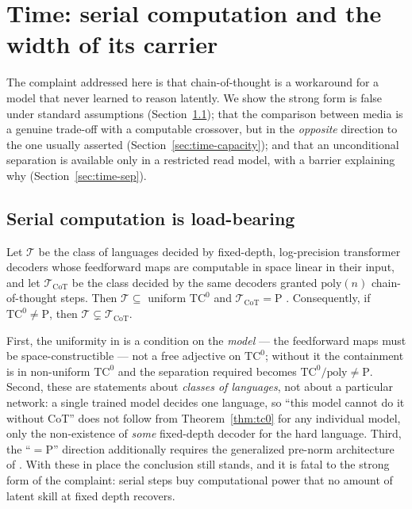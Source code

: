 \section{Time: serial computation and the width of its carrier}
\label{sec:time}

The complaint addressed here is that chain-of-thought is a workaround for a
model that never learned to reason latently. We show the strong form is false
under standard assumptions (Section~\ref{sec:time-necessary}); that the
comparison between media is a genuine trade-off with a computable crossover, but
in the \emph{opposite} direction to the one usually asserted
(Section~\ref{sec:time-capacity}); and that an unconditional separation is
available only in a restricted read model, with a barrier explaining why
(Section~\ref{sec:time-sep}).

\subsection{Serial computation is load-bearing}
\label{sec:time-necessary}

\begin{theorem}
\label{thm:tc0}
Let $\mathcal{T}$ be the class of languages decided by fixed-depth,
log-precision transformer decoders whose feedforward maps are computable in
space linear in their input, and let $\mathcal{T}_{\mathrm{CoT}}$ be the class
decided by the same decoders granted $\mathrm{poly}(n)$ chain-of-thought steps.
Then $\mathcal{T} \subseteq$ uniform $\mathrm{TC}^0$ \cite{merrill2023} and
$\mathcal{T}_{\mathrm{CoT}} = \mathrm{P}$ \cite{merrill2024}. Consequently, if
$\mathrm{TC}^0 \ne \mathrm{P}$, then
$\mathcal{T} \subsetneq \mathcal{T}_{\mathrm{CoT}}$.
\end{theorem}

\begin{remark}
\label{rem:tc0-care}
First, the uniformity in \cite{merrill2023} is a condition on the \emph{model}
--- the feedforward maps must be space-constructible --- not a free adjective on
$\mathrm{TC}^0$; without it the containment is in non-uniform $\mathrm{TC}^0$ and
the separation required becomes $\mathrm{TC}^0/\mathrm{poly} \ne \mathrm{P}$.
Second, these are statements about \emph{classes of languages}, not about a
particular network: a single trained model decides one language, so
``this model cannot do it without CoT'' does not follow from
Theorem~\ref{thm:tc0} for any individual model, only the non-existence of
\emph{some} fixed-depth decoder for the hard language. Third, the ``$=\mathrm{P}$''
direction additionally requires the generalized pre-norm architecture of
\cite{merrill2024}. With these in place the conclusion still stands, and it is
fatal to the strong form of the complaint: serial steps buy computational power
that no amount of latent skill at fixed depth recovers.
\end{remark}

